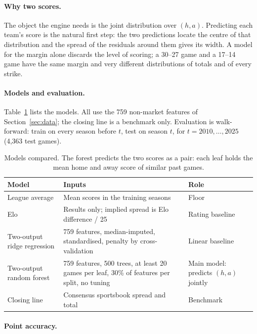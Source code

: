 \documentclass[11pt]{article}
\begin{document}
\paragraph{Why two scores.}

The object the engine needs is the joint distribution over $(h,a)$. Predicting each team's score is the natural first step: the two predictions locate the centre of that distribution and the spread of the residuals around them gives its width. A model for the margin alone discards the level of scoring; a 30--27 game and a 17--14 game have the same margin and very different distributions of totals and of every strike.

\paragraph{Models and evaluation.}

Table~\ref{tab:models} lists the models. All use the 759 non-market features of Section~\ref{sec:data}; the closing line is a benchmark only. Evaluation is walk-forward: train on every season before $t$, test on season $t$, for $t = 2010,\dots,2025$ (4,363 test games).

\begin{table}[H]
\centering
\small
\begin{tabular}{p{3.6cm}p{6.2cm}p{4cm}}
\toprule
\textbf{Model} & \textbf{Inputs} & \textbf{Role} \\
\midrule
League average & Mean scores in the training seasons & Floor \\
Elo & Results only; implied spread is Elo difference / 25 & Rating baseline \\
Two-output ridge regression & 759 features, median-imputed, standardised, penalty by cross-validation & Linear baseline \\
Two-output random forest & 759 features, 500 trees, at least 20 games per leaf, 30\% of features per split, no tuning & Main model: predicts $(h,a)$ jointly \\
Closing line & Consensus sportsbook spread and total & Benchmark \\
\bottomrule
\end{tabular}
\caption{Models compared. The forest predicts the two scores as a pair: each leaf holds the mean home and away score of similar past games.}
\label{tab:models}
\end{table}

\paragraph{Point accuracy.}
\end{document}
